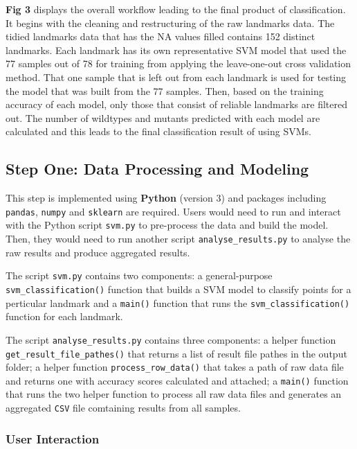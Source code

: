 \documentclass[10pt,letterpaper]{article}
\begin{document}
\textbf{Fig 3} displays the overall workflow leading to the final
product of classification. It begins with the cleaning and restructuring
of the raw landmarks data. The tidied landmarks data that has the NA
values filled contains 152 distinct landmarks. Each landmark has its own
representative SVM model that used the 77 samples out of 78 for training
from applying the leave-one-out cross validation method. That one sample
that is left out from each landmark is used for testing the model that
was built from the 77 samples. Then, based on the training accuracy of
each model, only those that consist of reliable landmarks are filtered
out. The number of wildtypes and mutants predicted with each model are
calculated and this leads to the final classification result of using
SVMs.

\subsection{Step One: Data Processing and
Modeling}\label{step-one-data-processing-and-modeling}

This step is implemented using \textbf{Python} (version 3) and packages
including \texttt{pandas}, \texttt{numpy} and \texttt{sklearn} are
required. Users would need to run and interact with the Python script
\texttt{svm.py} to pre-process the data and build the model. Then, they
would need to run another script \texttt{analyse\_results.py} to analyse
the raw results and produce aggregated results.

The script \texttt{svm.py} contains two components: a general-purpose
\texttt{svm\_classification()} function that builds a SVM model to
classify points for a perticular landmark and a \texttt{main()} function
that runs the \texttt{svm\_classification()} function for each landmark.

The script \texttt{analyse\_results.py} contains three components: a
helper function \texttt{get\_result\_file\_pathes()} that returns a list
of result file pathes in the output folder; a helper function
\texttt{process\_row\_data()} that takes a path of raw data file and
returns one with accuracy scores calculated and attached; a
\texttt{main()} function that runs the two helper function to process
all raw data files and generates an aggregated \texttt{CSV} file
comtaining results from all samples.

\subsubsection{User Interaction}\label{user-interaction}
\end{document}
